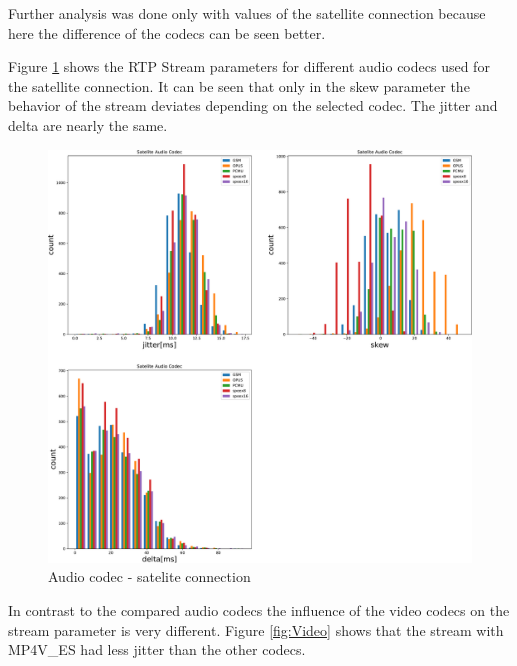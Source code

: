 \documentclass[parskip=full]{scrartcl}
\begin{document}
Further analysis was done only with values of the satellite connection because here the difference of the codecs can be seen better.

Figure \ref{fig:Audio} shows the RTP Stream parameters for different audio codecs used for the satellite connection. 
It can be seen that only in the skew parameter the behavior of the stream deviates depending on the selected codec.
The jitter and delta are nearly the same.



\begin{figure}[!ht]
	\centering %
	\includegraphics[width=\textwidth]{images/satelite-audio-histogram.pdf} %
	\caption{Audio codec - satelite connection} 
	\label{fig:Audio} %
\end{figure}

In contrast to the compared audio codecs the influence of the video codecs on the stream parameter is very different. Figure \ref{fig:Video} shows that the stream with MP4V\_ES had less jitter than the other codecs.
\end{document}
